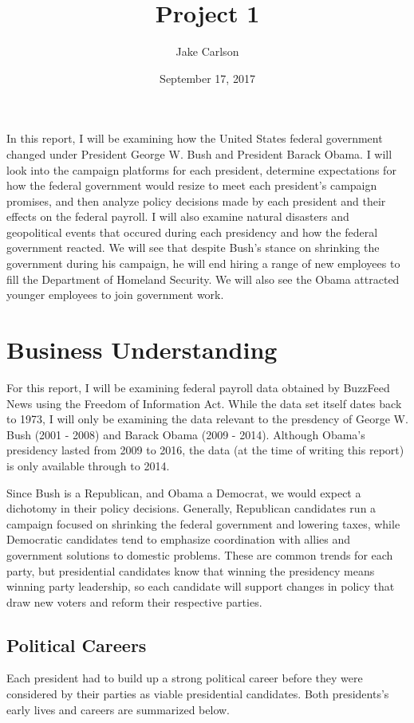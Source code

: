 \documentclass{article}
\begin{document}
\title{Project 1}
\author{Jake Carlson}
\date{September 17, 2017}
\maketitle

\abstract
In this report, I will be examining how the United States federal government changed under President George W. Bush and President Barack Obama. I will look into the campaign platforms for each president, determine expectations for how the federal government would resize to meet each president's campaign promises, and then analyze policy decisions made by each president and their effects on the federal payroll. I will also examine natural disasters and geopolitical events that occured during each presidency and how the federal government reacted. We will see that despite Bush's stance on shrinking the government during his campaign, he will end hiring a range of new employees to fill the Department of Homeland Security. We will also see the Obama attracted younger employees to join government work.
\newpage

\tableofcontents
\newpage

\section{Business Understanding}
For this report, I will be examining federal payroll data obtained by BuzzFeed News using the Freedom of Information Act. While the data set itself dates back to 1973, I will only be examining the data relevant to the presdency of George W. Bush (2001 - 2008) and Barack Obama (2009 - 2014). Although Obama's presidency lasted from 2009 to 2016, the data (at the time of writing this report) is only available through to 2014.
\par
Since Bush is a Republican, and Obama a Democrat, we would expect a dichotomy in their policy decisions. Generally, Republican candidates run a campaign focused on shrinking the federal government and lowering taxes, while Democratic candidates tend to emphasize coordination with allies and government solutions to domestic problems. These are common trends for each party, but presidential candidates know that winning the presidency means winning party leadership, so each candidate will support changes in policy that draw new voters and reform their respective parties.

    \subsection{Political Careers}
    Each president had to build up a strong political career before they were considered by their parties as viable presidential candidates. Both presidents's early lives and careers are summarized below.
\end{document}
